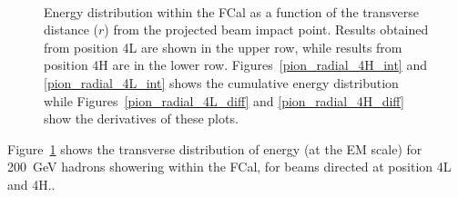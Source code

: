 \begin{figure}[!htb]
\begin{center}

 \\
\caption{Energy distribution within the FCal as a function of the transverse distance ($r$) from the projected beam impact point. Results obtained from position 4L are shown in the upper row, while results from position 4H are in the lower row. Figures~\ref{pion_radial_4H_int} and \ref{pion_radial_4L_int} shows the cumulative energy distribution while Figures~\ref{pion_radial_4L_diff} and \ref{pion_radial_4H_diff} show the derivatives of these plots. }
\label{TBplot_radial_profiles}
\end{center}
\end{figure}

Figure~\ref{TBplot_radial_profiles} shows the transverse distribution of energy (at the EM scale) for 200~GeV hadrons showering within the FCal, for beams directed at position 4L and 4H..  

